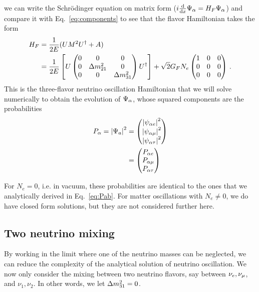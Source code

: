 we can write the Schrödinger equation on matrix form ($i \dv{}{x}\Psi_\alpha = H_F \Psi_\alpha$) and compare it with Eq.~\ref{eq:components} to see that the flavor Hamiltonian takes the form 
\begin{align}\label{eq:H_3gen}
    H_F &= \frac{1}{2E}(U M^2 U^\dagger + A) \nonumber \\
        &= \frac{1}{2E}\left[U \begin{pmatrix}
            0 & 0 & 0 \\
            0 & \dm_{21} & 0 \\
            0 & 0 & \dm_{31}
        \end{pmatrix} U^\dagger\right] + \sqrt{2}G_F N_e \begin{pmatrix}
            1 & 0 & 0 \\
            0 & 0 & 0 \\
            0 & 0 & 0
        \end{pmatrix}\,. 
\end{align}
This is the three-flavor neutrino oscillation Hamiltonian that we will solve numerically to obtain the evolution of $\Psi_\alpha$, whose squared components
are the probabilities
\begin{align}
    P_\alpha = \abs{\Psi_a}^2 &=\begin{pmatrix}
        \abs{\psi_{\alpha e}}^2 \\
        \abs{\psi_{\alpha \mu}}^{2} \\
        \abs{\psi_{\alpha \tau}}^{2}
    \end{pmatrix} \nonumber \\
    &=\begin{pmatrix}
        P_{\alpha e} \\
        P_{\alpha \mu} \\
        P_{\alpha \tau}
    \end{pmatrix} 
\end{align}

For $N_e = 0$, i.e. in vacuum, these probabilities are identical to the ones that we analytically derived in Eq.~\ref{eq:Pab}.
For matter oscillations with $N_e \neq 0$, we do have closed form solutions, but they are not considered further here. 

\subsection{Two neutrino mixing}
By working in the limit where one of the neutrino masses can be neglected, 
we can reduce the complexity of the analytical solution of neutrino oscillation. 
We now only consider the mixing between two neutrino flavors, say between $\nu_e, \nu_\mu$, and $\nu_1, \nu_2$. In other words, we let $\dm[31] = 0$.

